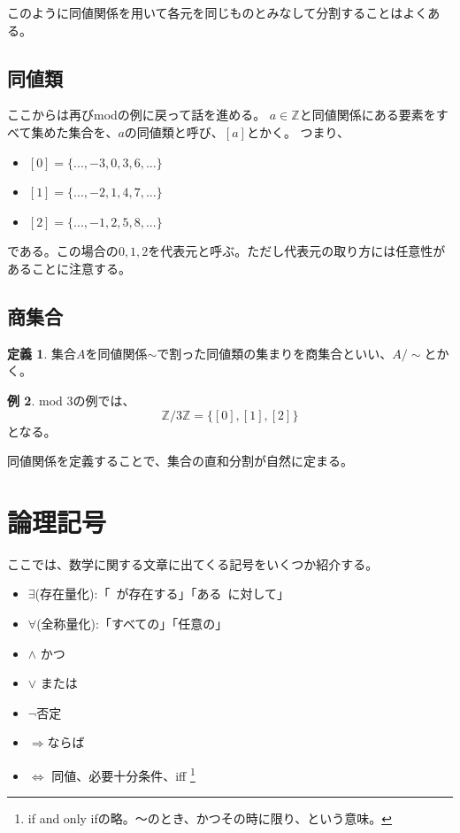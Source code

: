 \documentclass[unicode,12pt,report]{ltjsarticle}
\theoremstyle{definition}
\newtheorem{definition}{定義}[section]
\newtheorem{example}[definition]{例}
\begin{document}
このように同値関係を用いて各元を同じものとみなして分割することはよくある。
\subsection{同値類}
ここからは再びmodの例に戻って話を進める。
$a \in \mathbb{Z}$と同値関係にある要素をすべて集めた集合を、$a$の同値類と呼び、$[a]$とかく。
つまり、
\begin{itemize}
    \item $[0] = \{..., -3, 0, 3, 6, ...\}$
    \item $[1] = \{..., -2, 1, 4, 7, ...\}$
    \item $[2] = \{..., -1, 2, 5, 8, ...\}$
\end{itemize}
である。この場合の$0, 1, 2$を代表元と呼ぶ。ただし代表元の取り方には任意性があることに注意する。

\subsection{商集合}
\begin{definition}
    集合$A$を同値関係$\sim$で割った同値類の集まりを商集合といい、$A/\sim$とかく。
\end{definition}

\begin{example}
    mod 3の例では、$$\mathbb{Z}/3\mathbb{Z} = \{[0], [1], [2]\}$$
    となる。
\end{example}
同値関係を定義することで、集合の直和分割が自然に定まる。

\section{論理記号}
ここでは、数学に関する文章に出てくる記号をいくつか紹介する。
\begin{itemize}
    \item $\exists$(存在量化):「~が存在する」「ある~に対して」
    \item $\forall$(全称量化):「すべての」「任意の」
    \item $\wedge$ かつ
    \item $\vee $ または
    \item $\lnot $否定
    \item $\Rightarrow$ならば
    \item $\Leftrightarrow $ 同値、必要十分条件、iff \footnote{if and only ifの略。～のとき、かつその時に限り、という意味。}
\end{itemize}
\end{document}
